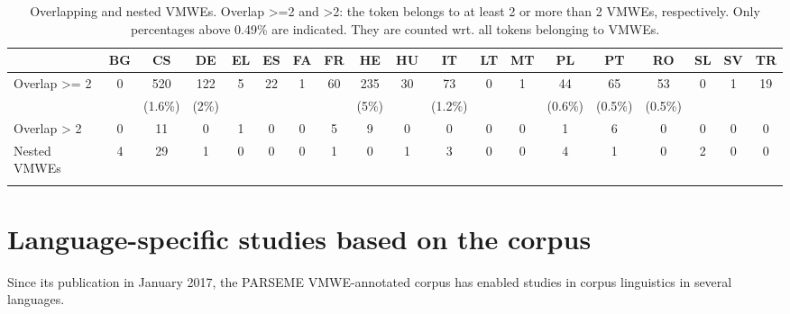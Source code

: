 \documentclass[output=paper,
modfonts,
]{langscibook}
\begin{document}
\begin{center}
\begin{table}[htp]
\setlength{\tabcolsep}{1pt}
\begin{small}
\begin{tabularx}{\textwidth}{lcccccccccccccccccc}
\lsptoprule
  &  BG & CS & DE & EL & ES & FA & FR & HE & HU & IT & LT & MT & PL & PT & RO & SL & SV & TR \\\midrule
Overlap >= 2 & 0 & 520 & 122 & 5 & 22 & 1 & 60 & 235 & 30 & 73 & 0 & 1 & 44 & 65 & 53 & 0 & 1 & 19 \\
  & & {\scriptsize (1.6\%)} & {\scriptsize (2\%)} & &  & &  & {\scriptsize (5\%)} & & {\scriptsize (1.2\%)} &  &  & {\scriptsize (0.6\%)} & {\scriptsize (0.5\%)} & {\scriptsize (0.5\%)} &  &  &  \\
Overlap > 2 & 0 & 11 & 0 & 1 & 0 & 0 & 5 & 9 & 0 & 0 & 0 & 0 & 1 & 6 & 0 & 0 & 0 & 0 \\
Nested VMWEs & 4 & 29 & 1 & 0 & 0 & 0 & 1 & 0 & 1 & 3 & 0 & 0 & 4 & 1 & 0 & 2 & 0 & 0 \\
\lspbottomrule
\end{tabularx}
\end{small}
\caption{Overlapping and nested VMWEs. Overlap >=2 and >2: the token belongs to at least 2 or more than 2 VMWEs, respectively. Only percentages above 0.49\% are indicated. They are counted wrt. all tokens belonging to VMWEs.}
\label{overlap}
\end{table}
\end{center}


\section{Language-specific studies based on the corpus}
\label{sec:corpus-studies}
%
Since its publication in January 2017, the PARSEME VMWE-annotated corpus has enabled studies in corpus linguistics in several languages. 
\end{document}
